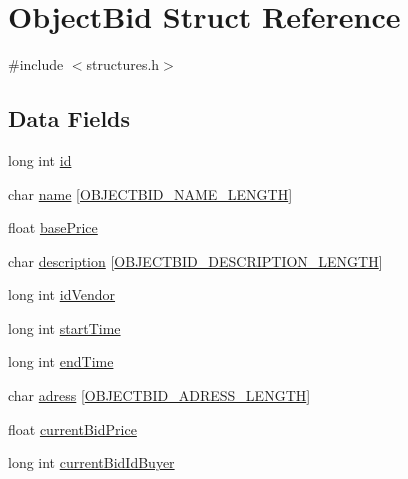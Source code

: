 \hypertarget{struct_object_bid}{\section{Object\-Bid Struct Reference}
\label{struct_object_bid}
}


{\ttfamily \#include $<$structures.\-h$>$}

\subsection*{Data Fields}
\begin{DoxyCompactItemize}
\item 
long int \hyperlink{struct_object_bid_a53f4656a3ccbae3d40e94f582eef745f}{id}
\item 
char \hyperlink{struct_object_bid_a8b0efa1f52a6b46d640cfcf93172083e}{name} \mbox{[}\hyperlink{defines_8h_a0caa3fa609352f1a2e1e727d9f963dfa}{O\-B\-J\-E\-C\-T\-B\-I\-D\-\_\-\-N\-A\-M\-E\-\_\-\-L\-E\-N\-G\-T\-H}\mbox{]}
\item 
float \hyperlink{struct_object_bid_ad7e7bdb2bbc09612e2b037a0df5d76dd}{base\-Price}
\item 
char \hyperlink{struct_object_bid_a203af9554762f924c14e5c30b24352a1}{description} \mbox{[}\hyperlink{defines_8h_a786b09e764b0e8442655b6b7c78ede00}{O\-B\-J\-E\-C\-T\-B\-I\-D\-\_\-\-D\-E\-S\-C\-R\-I\-P\-T\-I\-O\-N\-\_\-\-L\-E\-N\-G\-T\-H}\mbox{]}
\item 
long int \hyperlink{struct_object_bid_a56c855fe82a6ab9e09389c23a73eeec0}{id\-Vendor}
\item 
long int \hyperlink{struct_object_bid_a39256f6302441e1a26db958909e7431d}{start\-Time}
\item 
long int \hyperlink{struct_object_bid_a03ea3a2cebde4b5cae63c7105339c294}{end\-Time}
\item 
char \hyperlink{struct_object_bid_a05eb87542785d73c5aa5cbe4e3a6d262}{adress} \mbox{[}\hyperlink{defines_8h_a37a3e3c9149775a1de0391b6af399125}{O\-B\-J\-E\-C\-T\-B\-I\-D\-\_\-\-A\-D\-R\-E\-S\-S\-\_\-\-L\-E\-N\-G\-T\-H}\mbox{]}
\item 
float \hyperlink{struct_object_bid_a8864df4945a55f29bb320025d6011cc1}{current\-Bid\-Price}
\item 
long int \hyperlink{struct_object_bid_aa79adfae7ada9530c98f5510fc34a0f7}{current\-Bid\-Id\-Buyer}
\end{DoxyCompactItemize}


